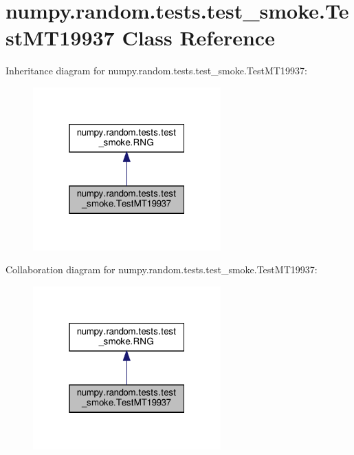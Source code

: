 \hypertarget{classnumpy_1_1random_1_1tests_1_1test__smoke_1_1TestMT19937}{}\section{numpy.\+random.\+tests.\+test\+\_\+smoke.\+Test\+M\+T19937 Class Reference}
\label{classnumpy_1_1random_1_1tests_1_1test__smoke_1_1TestMT19937}


Inheritance diagram for numpy.\+random.\+tests.\+test\+\_\+smoke.\+Test\+M\+T19937\+:
\nopagebreak
\begin{figure}[H]
\begin{center}
\leavevmode
\includegraphics[width=205pt]{classnumpy_1_1random_1_1tests_1_1test__smoke_1_1TestMT19937__inherit__graph}
\end{center}
\end{figure}


Collaboration diagram for numpy.\+random.\+tests.\+test\+\_\+smoke.\+Test\+M\+T19937\+:
\nopagebreak
\begin{figure}[H]
\begin{center}
\leavevmode
\includegraphics[width=205pt]{classnumpy_1_1random_1_1tests_1_1test__smoke_1_1TestMT19937__coll__graph}
\end{center}
\end{figure}
